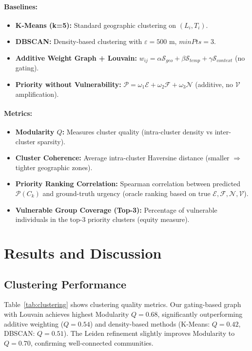 \documentclass[runningheads]{llncs}
\begin{document}
\paragraph{Baselines:}
\begin{itemize}
\item \textbf{K-Means (k=5):} Standard geographic clustering on $(L_i, T_i)$.
\item \textbf{DBSCAN:} Density-based clustering with $\varepsilon=500$ m, $minPts=3$.
\item \textbf{Additive Weight Graph + Louvain:} $w_{ij} = \alpha \mathcal{S}_{geo} + \beta \mathcal{S}_{temp} + \gamma \mathcal{S}_{context}$ (no gating).
\item \textbf{Priority without Vulnerability:} $\mathcal{P} = \omega_1 \mathcal{E} + \omega_2 \mathcal{F} + \omega_3 \mathcal{N}$ (additive, no $\mathcal{V}$ amplification).
\end{itemize}

\paragraph{Metrics:}
\begin{itemize}
\item \textbf{Modularity $Q$:} Measures cluster quality (intra-cluster density vs inter-cluster sparsity).
\item \textbf{Cluster Coherence:} Average intra-cluster Haversine distance (smaller $\Rightarrow$ tighter geographic zones).
\item \textbf{Priority Ranking Correlation:} Spearman correlation between predicted $\mathcal{P}(C_k)$ and ground-truth urgency (oracle ranking based on true $\mathcal{E}, \mathcal{F}, \mathcal{N}, \mathcal{V}$).
\item \textbf{Vulnerable Group Coverage (Top-3):} Percentage of vulnerable individuals in the top-3 priority clusters (equity measure).
\end{itemize}

\section{Results and Discussion}

\subsection{Clustering Performance}

Table~\ref{tab:clustering} shows clustering quality metrics. Our gating-based graph with Louvain achieves highest Modularity $Q=0.68$, significantly outperforming additive weighting ($Q=0.54$) and density-based methods (K-Means: $Q=0.42$, DBSCAN: $Q=0.51$). The Leiden refinement slightly improves Modularity to $Q=0.70$, confirming well-connected communities.
\end{document}

